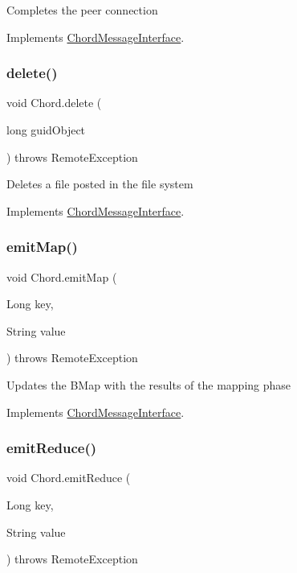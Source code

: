 Completes the peer connection 

Implements \mbox{\hyperlink{interface_chord_message_interface}{Chord\+Message\+Interface}}.

\mbox{\label{class_chord_a8bc6bdc9f92665955ae6907f15cc7ea6}} 
\subsubsection{\texorpdfstring{delete()}{delete()}}
{\footnotesize\ttfamily void Chord.\+delete (\begin{DoxyParamCaption}\item[{long}]{guid\+Object }\end{DoxyParamCaption}) throws Remote\+Exception\hspace{0.3cm}{\ttfamily [inline]}}

Deletes a file posted in the file system 

Implements \mbox{\hyperlink{interface_chord_message_interface}{Chord\+Message\+Interface}}.

\mbox{\label{class_chord_ad762227086fe020a1eeee133a8262b0d}} 
\subsubsection{\texorpdfstring{emit\+Map()}{emitMap()}}
{\footnotesize\ttfamily void Chord.\+emit\+Map (\begin{DoxyParamCaption}\item[{Long}]{key,  }\item[{String}]{value }\end{DoxyParamCaption}) throws Remote\+Exception\hspace{0.3cm}{\ttfamily [inline]}}

Updates the B\+Map with the results of the mapping phase 

Implements \mbox{\hyperlink{interface_chord_message_interface}{Chord\+Message\+Interface}}.

\mbox{\label{class_chord_af6d622a628500037eec2c4aee5274d40}} 
\subsubsection{\texorpdfstring{emit\+Reduce()}{emitReduce()}}
{\footnotesize\ttfamily void Chord.\+emit\+Reduce (\begin{DoxyParamCaption}\item[{Long}]{key,  }\item[{String}]{value }\end{DoxyParamCaption}) throws Remote\+Exception\hspace{0.3cm}{\ttfamily [inline]}}

